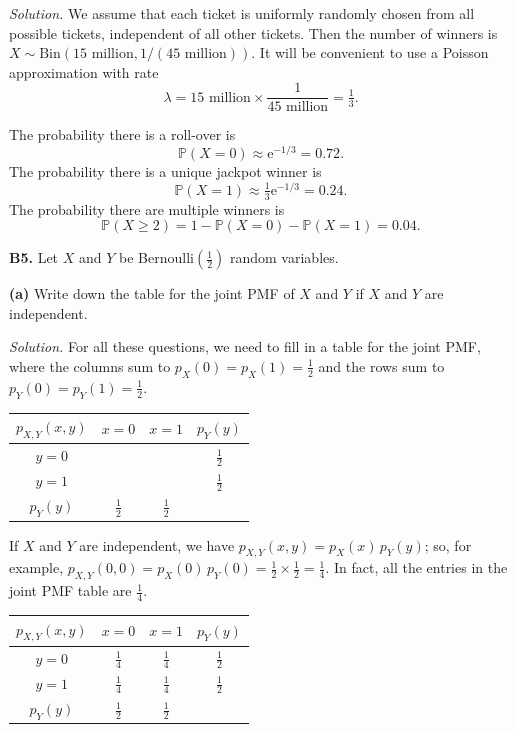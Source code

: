 \documentclass[
  a4paper,
]{book}
\theoremstyle{definition}
\theoremstyle{definition}
\theoremstyle{definition}
\theoremstyle{definition}
\theoremstyle{remark}
\begin{document}
\begin{myanswers}
\emph{Solution.}
We assume that each ticket is uniformly randomly chosen from all possible tickets, independent of all other tickets. Then the number of winners is \(X \sim \text{Bin}(15 \text{ million}, 1/(45 \text{ million}))\).
It will be convenient to use a Poisson approximation with rate
\[ \lambda = 15 \text{ million} \times \frac{1}{45 \text{ million}} = \tfrac13 .  \]

The probability there is a roll-over is
\[ \mathbb P(X = 0) \approx \mathrm e^{-1/3} = 0.72 . \]
The probability there is a unique jackpot winner is
\[ \mathbb P(X = 1) \approx \tfrac13 \mathrm e^{-1/3} = 0.24 . \]
The probability there are multiple winners is
\[ \mathbb P(X \geq 2) = 1 - \mathbb P(X = 0) - \mathbb P(X = 1) = 0.04  . \]

\end{myanswers}

\textbf{B5.} Let \(X\) and \(Y\) be Bernoulli\((\frac12)\) random variables.

\textbf{(a)} Write down the table for the joint PMF of \(X\) and \(Y\) if \(X\) and \(Y\) are independent.

\begin{myanswers}

\emph{Solution.}
For all these questions, we need to fill in a table for the joint PMF, where the columns sum to \(p_X(0) = p_X(1) = \frac12\) and the rows sum to \(p_Y(0) = p_Y(1) = \frac12\).

\begin{longtable}[]{@{}cccc@{}}
\toprule\noalign{}
\(p_{X,Y}(x,y)\) & \(x = 0\) & \(x = 1\) & \(p_Y(y)\) \\
\midrule\noalign{}
\endhead
\bottomrule\noalign{}
\endlastfoot
\(y = 0\) & & & \(\frac12\) \\
\(y = 1\) & & & \(\frac12\) \\
\(p_Y(y)\) & \(\frac12\) & \(\frac12\) & \\
\end{longtable}

If \(X\) and \(Y\) are independent, we have \(p_{X,Y}(x,y) = p_X(x)\,p_Y(y)\); so, for example, \(p_{X,Y}(0,0) = p_X(0)\,p_Y(0) = \frac12 \times \frac12 = \frac14\). In fact, all the entries in the joint PMF table are \(\frac14\).

\begin{longtable}[]{@{}cccc@{}}
\toprule\noalign{}
\(p_{X,Y}(x,y)\) & \(x = 0\) & \(x = 1\) & \(p_Y(y)\) \\
\midrule\noalign{}
\endhead
\bottomrule\noalign{}
\endlastfoot
\(y = 0\) & \(\frac14\) & \(\frac14\) & \(\frac12\) \\
\(y = 1\) & \(\frac14\) & \(\frac14\) & \(\frac12\) \\
\(p_Y(y)\) & \(\frac12\) & \(\frac12\) & \\
\end{longtable}

\end{myanswers}
\end{document}
